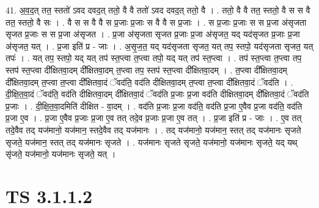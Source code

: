 \documentclass[17pt]{extarticle}
\begin{document}
41. अ॒व॒द॒त् तत॒ स्ततो॑ ऽवद दवद॒त् ततो॒ वै वै ततो॑ ऽवद दवद॒त् ततो॒ वै । . ततो॒ वै वै तत॒ स्ततो॒ वै स स वै तत॒ स्ततो॒ वै सः । . वै स स वै वै स प्र॒जाः प्र॒जाः स वै वै स प्र॒जाः । . स प्र॒जाः प्र॒जाः स स प्र॒जा अ॑सृजता सृजत प्र॒जाः स स प्र॒जा अ॑सृजत । . प्र॒जा अ॑सृजता सृजत प्र॒जाः प्र॒जा अ॑सृजत॒ यद् यद॑सृजत प्र॒जाः प्र॒जा अ॑सृजत॒ यत् । . प्र॒जा इति॑ प्र - जाः । . अ॒सृ॒ज॒त॒ यद् यद॑सृजता सृजत॒ यत् तप॒ स्तपो॒ यद॑सृजता सृजत॒ यत् तपः॑ । . यत् तप॒ स्तपो॒ यद् यत् तप॑ स्त॒प्त्वा त॒प्त्वा तपो॒ यद् यत् तप॑ स्त॒प्त्वा । . तप॑ स्त॒प्त्वा त॒प्त्वा तप॒ स्तप॑ स्त॒प्त्वा दी᳚क्षितवा॒दम् दी᳚क्षितवा॒दम् त॒प्त्वा तप॒ स्तप॑ स्त॒प्त्वा दी᳚क्षितवा॒दम् । . त॒प्त्वा दी᳚क्षितवा॒दम् दी᳚क्षितवा॒दम् त॒प्त्वा त॒प्त्वा दी᳚क्षितवा॒दं ॅवद॑ति॒ वद॑ति दीक्षितवा॒दम् त॒प्त्वा त॒प्त्वा दी᳚क्षितवा॒दं ॅवद॑ति । . दी॒क्षि॒त॒वा॒दं ॅवद॑ति॒ वद॑ति दीक्षितवा॒दम् दी᳚क्षितवा॒दं ॅवद॑ति प्र॒जाः प्र॒जा वद॑ति दीक्षितवा॒दम् दी᳚क्षितवा॒दं ॅवद॑ति प्र॒जाः । . दी॒क्षि॒त॒वा॒दमिति॑ दीक्षित - वा॒दम् । . वद॑ति प्र॒जाः प्र॒जा वद॑ति॒ वद॑ति प्र॒जा ए॒वैव प्र॒जा वद॑ति॒ वद॑ति प्र॒जा ए॒व । . प्र॒जा ए॒वैव प्र॒जाः प्र॒जा ए॒व तत् तदे॒व प्र॒जाः प्र॒जा ए॒व तत् । . प्र॒जा इति॑ प्र - जाः । . ए॒व तत् तदे॒वैव तद् यज॑मानो॒ यज॑मान॒ स्तदे॒वैव तद् यज॑मानः । . तद् यज॑मानो॒ यज॑मान॒ स्तत् तद् यज॑मानः सृजते सृजते॒ यज॑मान॒ स्तत् तद् यज॑मानः सृजते । . यज॑मानः सृजते सृजते॒ यज॑मानो॒ यज॑मानः सृजते॒ यद् यथ् सृ॑जते॒ यज॑मानो॒ यज॑मानः सृजते॒ यत् । \newline
\pagebreak
{}

\section{ TS 3.1.1.2 }
\end{document}
